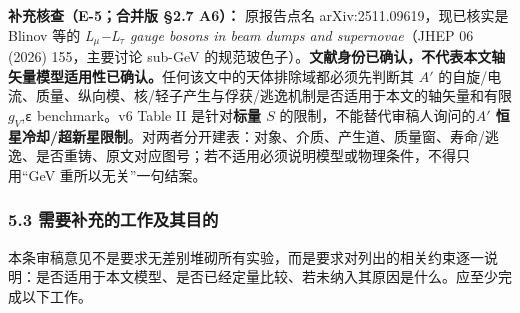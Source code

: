\documentclass[
]{article}
\begin{document}
\textbf{补充核查（E-5；合并版 §2.7 A6）：} 原报告点名
arXiv:2511.09619，现已核实是 Blinov 等的 \emph{L\(_\mu\)−L\(_\tau\)
gauge bosons in beam dumps and supernovae}（JHEP 06 (2026) 155，主要讨论
sub-GeV
的规范玻色子）。\textbf{文献身份已确认，不代表本文轴矢量模型适用性已确认。}任何该文中的天体排除域都必须先判断其
\(A'\)
的自旋/电流、质量、纵向模、核/轻子产生与俘获/逃逸机制是否适用于本文的轴矢量和有限
\(g_V\),\texttt{ε} benchmark。v6 Table II 是针对\textbf{标量 \(S\)}
的限制，不能替代审稿人询问的\textbf{\(A'\)
恒星冷却/超新星限制}。对两者分开建表：对象、介质、产生道、质量窗、寿命/逃逸、是否重铸、原文对应图号；若不适用必须说明模型或物理条件，不得只用``GeV
重所以无关''一句结案。

\subsubsection{5.3
需要补充的工作及其目的}\label{ux9700ux8981ux8865ux5145ux7684ux5de5ux4f5cux53caux5176ux76eeux7684-3}

本条审稿意见不是要求无差别堆砌所有实验，而是要求对列出的相关约束逐一说明：是否适用于本文模型、是否已经定量比较、若未纳入其原因是什么。应至少完成以下工作。
\end{document}

